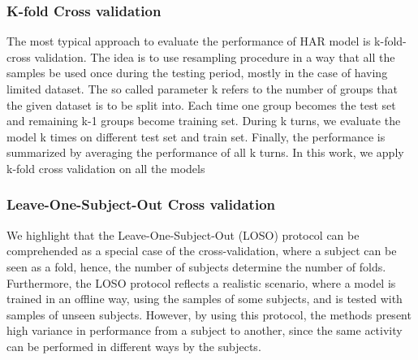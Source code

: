 \documentclass[journal,article,submit,moreauthors,pdftex]{Definitions/mdpi}
\begin{document}
\subsubsection{K-fold Cross validation}
The most typical approach to evaluate the performance of HAR model is k-fold-cross validation. The idea is to use resampling procedure in a way that all the samples be used once during the testing period, mostly in the case of having limited dataset. The so called parameter k refers to the number of groups that the given dataset is to be split into. Each time one group becomes the test set and remaining k-1 groups become training set. During k turns, we evaluate the model k times on different test set and train set. Finally, the performance is summarized by averaging the performance of all k turns. In this work, we apply k-fold cross validation on all the models
\subsubsection{Leave-One-Subject-Out Cross validation}
We highlight that the Leave-One-Subject-Out (LOSO) protocol can be comprehended as a special case of the cross-validation, where a subject can be seen as a fold, hence, the number of subjects determine the number of folds. Furthermore, the LOSO protocol reflects a realistic scenario, where a model is trained in an offline way, using the samples of some subjects, and is tested with samples of unseen subjects. However, by using this protocol, the methods present high variance in performance from a subject to another, since the same activity can be performed in different ways by the subjects. 
\end{document}
